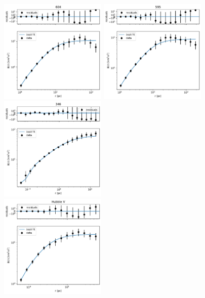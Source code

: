 \documentclass[fleqn,usenatbib, useAMS, a4paper]{mnras}
\begin{document}

\begin{figure}
 \centering
 \begin{multicols}{3}
 \includegraphics[width=2in]{Figures/SFplots/604.pdf}\par
 \includegraphics[width=2in]{Figures/SFplots/595.pdf}\par
 \includegraphics[width=2in]{Figures/SFplots/346.pdf}\par
 \end{multicols}
 \begin{multicols}{3}
 \includegraphics[width=2in]{Figures/SFplots/Hubble V.pdf}\par

\end{multicols}
\end{figure}
\end{document}

